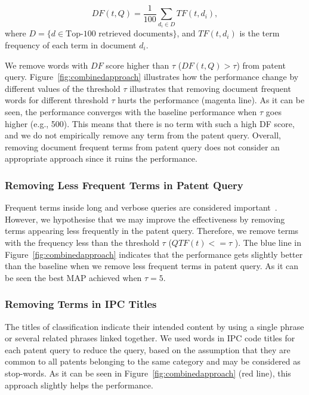 \begin{equation}
 DF(t, Q)=\frac{1}{100}\sum_{d_i\in  D} TF(t, d_i),    
 \label{eq:df}
\end{equation}
where $D=\{d\in \mbox{Top-100 retrieved documents}\}$, and $TF(t, d_i)$ is the term frequency of each term in document $d_i$.

We remove words with $\mathit{DF}$ score higher than $\tau$ ($DF(t, Q)>\tau$) from patent query. Figure~\ref{fig:combinedapproach} illustrates how the performance change by different values of the threshold $\tau$ illustrates that removing document frequent words for different threshold $\tau$ hurts the performance (magenta line). As it can be seen, the performance converges with the baseline performance when $\tau$ goes higher (e.g., 500). This means that there is no term with such a high DF score, and we do not empirically remove any term from the patent query. Overall, removing document frequent terms from patent query does not consider an appropriate approach since it ruins the performance. 
\subsubsection{Removing Less Frequent Terms in Patent Query}
Frequent terms inside long and verbose queries are considered important~\citep{maxwell2013compact}. However, we hypothesise that we may improve the effectiveness by removing terms appearing less frequently in the patent query. Therefore, we remove terms with the frequency less than the threshold $\tau$ ($QTF(t)<=\tau$ ). The blue line in Figure~\ref{fig:combinedapproach} indicates that the performance gets slightly better than the baseline when we remove less frequent terms in patent query. As it can be seen the best MAP achieved when $\tau=5$. 
\subsubsection{Removing Terms in IPC Titles}
The titles of classification indicate their intended content by using a single phrase or several related phrases linked together. We used words in IPC code titles for each patent query to reduce the query, based on the assumption that they are common to all patents belonging to the same category and may be considered as stop-words. As it can be seen in Figure~\ref{fig:combinedapproach} (red line), this approach slightly helps the performance.
